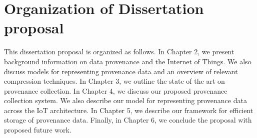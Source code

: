\section{Organization of Dissertation proposal}

This dissertation proposal is organized as follows. In Chapter 2, we present background information on data provenance and the Internet of Things. We also discuss models for representing provenance data and an overview of relevant compression techniques. In Chapter 3, we outline the state of the art on provenance collection. In Chapter 4, we discuss our proposed provenance collection system. We also describe our model for representing provenance data across the IoT architecture. In Chapter 5, we describe our framework for efficient storage of provenance data. Finally, in Chapter 6, we conclude the proposal with proposed future work.

